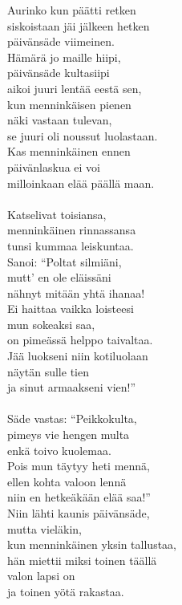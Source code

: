 
        Aurinko kun päätti retken \\
        siskoistaan jäi jälkeen hetken \\
        päivänsäde viimeinen. \\
        Hämärä jo maille hiipi, \\
        päivänsäde kultasiipi \\
        aikoi juuri lentää eestä sen, \\
        kun menninkäisen pienen \\
        näki vastaan tulevan, \\
        se juuri oli noussut luolastaan. \\
        Kas menninkäinen ennen \\
        päivänlaskua ei voi \\
        milloinkaan elää päällä maan. \\
\hspace{10mm} \\
        Katselivat toisiansa, \\
        menninkäinen rinnassansa \\
        tunsi kummaa leiskuntaa. \\
        Sanoi: “Poltat silmiäni, \\
        mutt' en ole eläissäni \\
        nähnyt mitään yhtä ihanaa! \\
        Ei haittaa vaikka loisteesi \\
        mun sokeaksi saa, \\
        on pimeässä helppo taivaltaa. \\
        Jää luokseni niin kotiluolaan \\
        näytän sulle tien \\
        ja sinut armaakseni vien!” \\
\hspace{10mm} \\
        Säde vastas: “Peikkokulta, \\
        pimeys vie hengen multa \\
        enkä toivo kuolemaa. \\
        Pois mun täytyy heti mennä, \\
        ellen kohta valoon lennä \\
        niin en hetkeäkään elää saa!” \\
        Niin lähti kaunis päivänsäde, \\
        mutta vieläkin, \\
        kun menninkäinen yksin tallustaa, \\
        hän miettii miksi toinen täällä \\
        valon lapsi on \\
        ja toinen yötä rakastaa. \\
